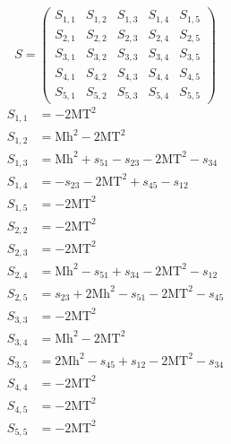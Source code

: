 \documentclass[a4paper]{article}
\begin{document}
\begin{equation}
S=\left(\begin{array}{ccccc}
   S_{1,1}&
   S_{1,2}&
   S_{1,3}&
   S_{1,4}&
   S_{1,5}\\
   S_{2,1}&
   S_{2,2}&
   S_{2,3}&
   S_{2,4}&
   S_{2,5}\\
   S_{3,1}&
   S_{3,2}&
   S_{3,3}&
   S_{3,4}&
   S_{3,5}\\
   S_{4,1}&
   S_{4,2}&
   S_{4,3}&
   S_{4,4}&
   S_{4,5}\\
   S_{5,1}&
   S_{5,2}&
   S_{5,3}&
   S_{5,4}&
   S_{5,5}\end{array}\right)
\end{equation}
\begin{subequations}
\begin{align}
   S_{1,1}&=-2\text{MT}^2\\
   S_{1,2}&=\text{Mh}^2-2\text{MT}^2\\
   S_{1,3}&=\text{Mh}^2+s_{51}-s_{23}-2\text{MT}^2-s_{34}\\
   S_{1,4}&=-s_{23}-2\text{MT}^2+s_{45}-s_{12}\\
   S_{1,5}&=-2\text{MT}^2\\
   S_{2,2}&=-2\text{MT}^2\\
   S_{2,3}&=-2\text{MT}^2\\
   S_{2,4}&=\text{Mh}^2-s_{51}+s_{34}-2\text{MT}^2-s_{12}\\
   S_{2,5}&=s_{23}+2\text{Mh}^2-s_{51}-2\text{MT}^2-s_{45}\\
   S_{3,3}&=-2\text{MT}^2\\
   S_{3,4}&=\text{Mh}^2-2\text{MT}^2\\
   S_{3,5}&=2\text{Mh}^2-s_{45}+s_{12}-2\text{MT}^2-s_{34}\\
   S_{4,4}&=-2\text{MT}^2\\
   S_{4,5}&=-2\text{MT}^2\\
   S_{5,5}&=-2\text{MT}^2
\end{align}
\end{subequations}
\end{document}
